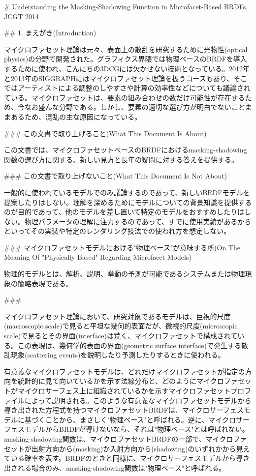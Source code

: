 # Understanding the Masking-Shadowing Function in Microfacet-Based BRDFs, JCGT 2014

## 1. まえがき(Introduction)

マイクロファセット理論は元々、表面上の散乱を研究するために光物性(optical physics)の分野で開発された。グラフィクス界隈では物理ベースのBRDFを導入するために使われ、こんにちの3DCGには欠かせない技術となっている。2012年と2013年のSIGGRAPHにはマイクロファセット理論を扱うコースもあり、そこではアーティストによる調整のしやすさや計算の効率性などについても議論されている。マイクロファセットは、要素の組み合わせの数だけ可能性が存在するため、今なお盛んな分野である。しかし、要素の適切な選び方が明白でないことままあるため、混乱の主な原因になっている。

### この文書で取り上げること(What This Document Is About)

この文書では、マイクロファセットベースのBRDFにおけるmasking-shadowing関数の選び方に関する、新しい見方と長年の疑問に対する答えを提供する。

### この文書で取り上げないこと(What This Document Is Not About)

一般的に使われているモデルでのみ議論するのであって、新しいBRDFモデルを提案したりはしない。理解を深めるためにモデルについての背景知識を提供するのが目的であって、他のモデルを差し置いて特定のモデルをおすすめしたりはしない。物理パラメータの理解に注力するのであって、すでに使用実績があるからといってその実装や特定のレンダリング技法での使われ方を想定しない。

### マイクロファセットモデルにおける"物理ベース"が意味する所(On The Meaning Of "Physically Based" Regarding Microfacet Models)

物理的モデルとは、解析、説明、挙動の予測が可能であるシステムまたは物理現象の簡略表現である。

###

マイクロファセット理論において、研究対象であるモデルは、巨視的尺度(macroscopic scale)で見ると平坦な幾何的表面だが、微視的尺度(microscopic scale)で見るとその界面(interface)は荒く、マイクロファセットで構成されている。この表現は、幾何学的表面の界面(geometric surface interface)で発生する散乱現象(scattering events)を説明したり予測したりするときに使われる。

有意義なマイクロファセットモデルは、どれだけマイクロファセットが指定の方向を統計的に見て向いているかを示す法線分布と、どのようにマイクロファセットがマイクロサーフェス上に組織されているかを示すマイクロファセットプロファイルによって説明される。このような有意義なマイクロファセットモデルから導き出された方程式を持つマイクロファセットBRDFは、マイクロサーフェスモデルに基づくことから、まさしく"物理ベース"と呼ばれる。逆に、マイクロサーフェスモデルからBRDFが導けないなら、それは"物理ベース"とは呼ばれない。masking-shadowing関数は、マイクロファセットBRDFの一部で、マイクロファセットが出射方向から(masking)か入射方向から(shadowing)のいずれかから見えている確率を表す。BRDFのときと同様に、マイクロサーフェスモデルから導き出される場合のみ、masking-shadowing関数は"物理ベース"と呼ばれる。

